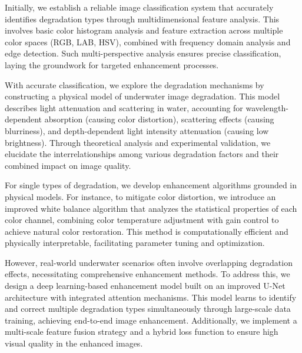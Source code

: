 \documentclass{apmcmthesis}
\begin{document}
Initially, we establish a reliable image classification system that accurately identifies degradation types through multidimensional feature analysis. This involves basic color histogram analysis and feature extraction across multiple color spaces (RGB, LAB, HSV), combined with frequency domain analysis and edge detection. Such multi-perspective analysis ensures precise classification, laying the groundwork for targeted enhancement processes.

With accurate classification, we explore the degradation mechanisms by constructing a physical model of underwater image degradation. This model describes light attenuation and scattering in water, accounting for wavelength-dependent absorption (causing color distortion), scattering effects (causing blurriness), and depth-dependent light intensity attenuation (causing low brightness). Through theoretical analysis and experimental validation, we elucidate the interrelationships among various degradation factors and their combined impact on image quality.

For single types of degradation, we develop enhancement algorithms grounded in physical models. For instance, to mitigate color distortion, we introduce an improved white balance algorithm that analyzes the statistical properties of each color channel, combining color temperature adjustment with gain control to achieve natural color restoration. This method is computationally efficient and physically interpretable, facilitating parameter tuning and optimization.

However, real-world underwater scenarios often involve overlapping degradation effects, necessitating comprehensive enhancement methods. To address this, we design a deep learning-based enhancement model built on an improved U-Net architecture with integrated attention mechanisms. This model learns to identify and correct multiple degradation types simultaneously through large-scale data training, achieving end-to-end image enhancement. Additionally, we implement a multi-scale feature fusion strategy and a hybrid loss function to ensure high visual quality in the enhanced images.
\end{document}
